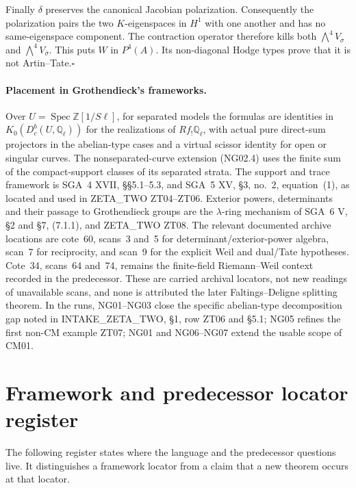 \documentclass[11pt]{article}
\theoremstyle{remark}
\begin{document}
Finally $\delta$ preserves the canonical Jacobian polarization.
Consequently the polarization pairs the two $K$-eigenspaces in
$H^1$ with one another and has no same-eigenspace component.  The
contraction operator therefore kills both
$\bigwedge^4 V_\sigma$ and $\bigwedge^4 V_{\bar\sigma}$.
This puts $W$ in $P^4(A)$.  Its non-diagonal Hodge types prove that
it is not Artin--Tate.\hfill$\square$

\paragraph{Placement in Grothendieck's frameworks.}
Over $U=\operatorname{Spec}\mathbb Z[1/S\ell]$, for separated models
the formulas are
identities in $K_0(D_c^b(U,\mathbb Q_\ell))$ for the realizations of
$Rf_!\mathbb Q_\ell$, with actual pure direct-sum projectors in the
abelian-type cases and a virtual scissor identity for open or singular
curves.  The nonseparated-curve extension (NG02.4) uses the finite sum
of the compact-support classes of its separated strata.
The support and trace framework is SGA~4 XVII,
\S\S5.1--5.3, and SGA~5 XV, \S3, no.~2, equation~(1), as located and
used in ZETA\_TWO ZT04--ZT06.  Exterior powers, determinants and
their passage to Grothendieck groups are the $\lambda$-ring mechanism
of SGA~6 V, \S2 and \S7, (7.1.1), and ZETA\_TWO ZT08.
The relevant documented archive locations are cote~60, scans~3 and~5
for determinant/exterior-power algebra, scan~7 for reciprocity, and
scan~9 for the explicit Weil and dual/Tate hypotheses.  Cote~34,
scans~64 and~74, remains the finite-field Riemann--Weil context
recorded in the predecessor.  These are carried archival locators,
not new readings of unavailable scans, and none is attributed the
later Faltings--Deligne splitting theorem.  In the runs, NG01--NG03
close the specific abelian-type decomposition gap noted in
INTAKE\_ZETA\_TWO, \S1, row ZT06 and \S5.1; NG05 refines the first
non-CM example ZT07; NG01 and NG06--NG07 extend the usable scope of CM01.


\clearpage
\section{Framework and predecessor locator register}

The following register states where the language and the predecessor
questions live.  It distinguishes a framework locator from a claim
that a new theorem occurs at that locator.
\end{document}
